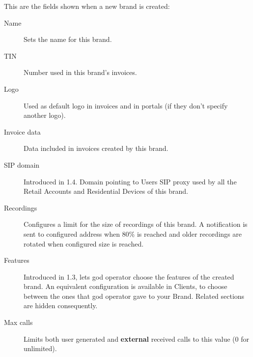 \documentclass[letterpaper,10pt,spanish]{sphinxmanual}
\begin{document}
This are the fields shown when a new brand is created:
\begin{description}
\item[{Name}] \leavevmode{}\label{administration_portal/platform/brands:term-name}
Sets the name for this brand.

\item[{TIN}] \leavevmode{}\label{administration_portal/platform/brands:term-tin}
Number used in this brand's invoices.

\item[{Logo}] \leavevmode{}\label{administration_portal/platform/brands:term-logo}
Used as default logo in invoices and in portals (if they don't specify
another logo).

\item[{Invoice data}] \leavevmode{}\label{administration_portal/platform/brands:term-invoice-data}
Data included in invoices created by this brand.

\item[{SIP domain}] \leavevmode{}\label{administration_portal/platform/brands:term-sip-domain}
Introduced in 1.4. Domain pointing to Users SIP proxy used by all the
Retail Accounts and Residential Devices of this brand.

\item[{Recordings}] \leavevmode{}\label{administration_portal/platform/brands:term-recordings}
Configures a limit for the size of recordings of this brand. A
notification is sent to configured address when 80\% is reached and
older recordings are rotated when configured size is reached.

\item[{Features}] \leavevmode{}\label{administration_portal/platform/brands:term-features}
Introduced in 1.3, lets god operator choose the features of the created
brand. An equivalent configuration is available in Clients, to choose
between the ones that god operator gave to your Brand. Related sections
are hidden consequently.

\item[{Max calls}] \leavevmode{}\label{administration_portal/platform/brands:term-max-calls}
Limits both user generated and \textbf{external} received calls to this value
(0 for unlimited).


\end{description}
\end{document}
